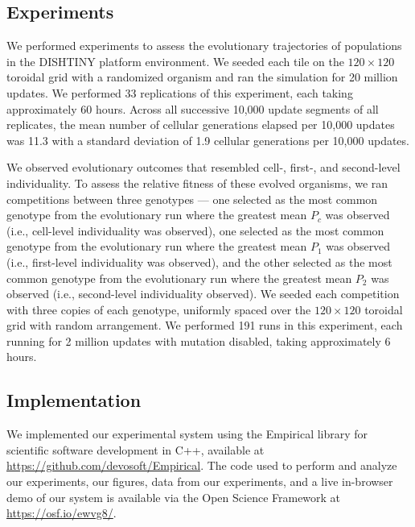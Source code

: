 \subsection{Experiments}

We performed experiments to assess the evolutionary trajectories of populations in the DISHTINY platform environment.
We seeded each tile on the $120 \times 120$ toroidal grid with a randomized organism and ran the simulation for 20 million updates.
We performed 33 replications of this experiment, each taking approximately 60 hours.
Across all successive 10,000 update segments of all replicates, the mean number of cellular generations elapsed per 10,000 updates was 11.3 with a standard deviation of 1.9 cellular generations per 10,000 updates.

We observed evolutionary outcomes that resembled cell-, first-, and second-level individuality.
To assess the relative fitness of these evolved organisms, we ran %
 competitions between three genotypes --- one selected as the most common genotype from the evolutionary run where the greatest mean $P_{c}$ was observed (i.e., cell-level individuality was observed), one selected as the most common genotype from the evolutionary run where the greatest mean $P_1$ was observed (i.e., first-level individuality was observed), and the other selected as the most common genotype from the evolutionary run where the greatest mean $P_2$ was observed (i.e., second-level individuality observed).
We seeded each %
competition with three copies of each genotype, uniformly spaced over the $120 \times 120$ toroidal grid with random arrangement.
We performed 191 runs in this experiment, each running for 2 million updates with mutation disabled, taking approximately 6 hours.

\subsection{Implementation}

We implemented our experimental system using the Empirical library for scientific software development in C++, available at \url{https://github.com/devosoft/Empirical}.  The code used to perform and analyze our experiments, our figures, data from our experiments, and a live in-browser demo of our system is available via the Open Science Framework at \url{https://osf.io/ewvg8/}.
